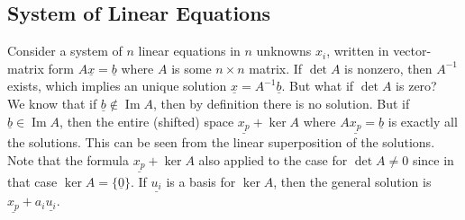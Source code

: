 \subsection{System of Linear Equations}
Consider a system of $n$ linear equations in $n$ unknowns $x_i$, written in vector-matrix form $A\underline{x}=\underline{b}$ where $A$ is some $n\times n$ matrix.
If $\det A$ is nonzero, then $A^{-1}$ exists, which implies an unique solution $\underline{x}=A^{-1}\underline{b}$.
But what if $\det A$ is zero?\\
We know that if $\underline{b}\notin\operatorname{Im}A$, then by definition there is no solution.
But if $\underline{b}\in\operatorname{Im}A$, then the entire (shifted) space $\underline{x_p}+\ker{A}$ where $A\underline{x_p}=\underline{b}$ is exactly all the solutions.
This can be seen from the linear superposition of the solutions.\\
Note that the formula $\underline{x_p}+\ker{A}$ also applied to the case for $\det A\neq 0$ since in that case $\ker{A}=\{\underline{0}\}$.
If $\underline{u_i}$ is a basis for $\ker{A}$, then the general solution is $\underline{x_p}+a_i\underline{u_i}$.
